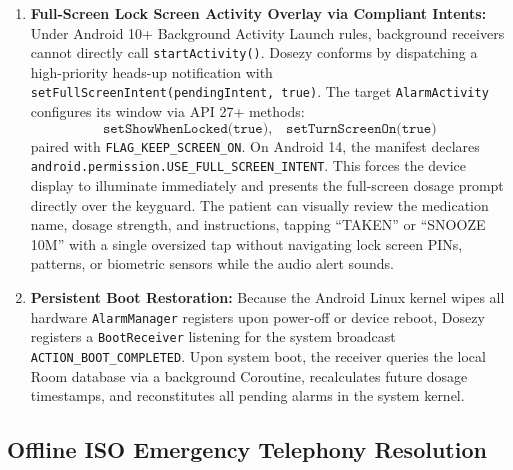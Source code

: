 \documentclass[11pt,a4paper]{article}
\begin{document}
\begin{enumerate}[leftmargin=*]
\begin{itemize}
    \end{itemize}
    Dosezy declares both permissions in its manifest. At runtime, the application evaluates \texttt{AlarmManager.canScheduleExactAlarms()}. If exact scheduling is revoked or denied (such as on fresh Android 14 installations distributed outside privileged stores), Dosezy presents a high-contrast explanation dialog and dispatches an explicit system intent:
    \begin{equation*}
        \texttt{Intent(Settings.ACTION\_REQUEST\_SCHEDULE\_EXACT\_ALARM, Uri.parse("package:" + packageName))}
    \end{equation*}
    navigating the user directly to the application's dedicated system toggle to minimize cognitive and navigational friction.
    \item \textbf{Full-Screen Lock Screen Activity Overlay via Compliant Intents:} Under Android 10+ Background Activity Launch rules, background receivers cannot directly call \texttt{startActivity()}. Dosezy conforms by dispatching a high-priority heads-up notification with \texttt{setFullScreenIntent(pendingIntent, true)}. The target \texttt{AlarmActivity} configures its window via API 27+ methods:
    \begin{equation*}
        \texttt{setShowWhenLocked(true)},\quad \texttt{setTurnScreenOn(true)}
    \end{equation*}
    paired with \texttt{FLAG\_KEEP\_SCREEN\_ON}. On Android 14, the manifest declares \texttt{android.permission.USE\_FULL\_SCREEN\_INTENT}. This forces the device display to illuminate immediately and presents the full-screen dosage prompt directly over the keyguard. The patient can visually review the medication name, dosage strength, and instructions, tapping ``TAKEN'' or ``SNOOZE 10M'' with a single oversized tap without navigating lock screen PINs, patterns, or biometric sensors while the audio alert sounds.
    \item \textbf{Persistent Boot Restoration:} Because the Android Linux kernel wipes all hardware \texttt{AlarmManager} registers upon power-off or device reboot, Dosezy registers a \texttt{BootReceiver} listening for the system broadcast \texttt{ACTION\_BOOT\_COMPLETED}. Upon system boot, the receiver queries the local Room database via a background Coroutine, recalculates future dosage timestamps, and reconstitutes all pending alarms in the system kernel.
\end{enumerate}

\subsection{Offline ISO Emergency Telephony Resolution}
\end{document}
